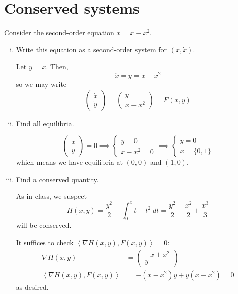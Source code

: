 \documentclass[12pt]{article}
\newcommand{\brak}[1]{\left\langle #1 \right\rangle}
\begin{document}
\pagebreak


\section{Conserved systems}

Consider the second-order equation $\ddot{x}=x-x^2$.
\begin{enumerate}[(i)]
    \item Write this equation as a second-order system for $(x,\dot{x})$.

          \color{blue}
          Let $y = \dot x$. Then,
          \[\ddot x = \dot y = x - x^2\]
          so we may write
          \[\begin{pmatrix}
                  \dot x \\
                  \dot y
              \end{pmatrix} = \begin{pmatrix}
                  y \\
                  x - x^2
              \end{pmatrix} = F(x, y)\]
          \color{black}

    \item Find all equilibria.

          \color{blue}
          \[\begin{pmatrix}
                  \dot x \\
                  \dot y
              \end{pmatrix} = 0 \implies \begin{cases}
                  y = 0 \\
                  x - x^2 = 0
              \end{cases} \implies \begin{cases}
                  y = 0 \\
                  x = \{0, 1\}
              \end{cases}\]
          which means we have equilibria at $(0, 0)$ and $(1, 0)$.
          \color{black}

    \item Find a conserved quantity.

          \color{blue}
          As in class, we suspect
          \[H(x, y)  = \frac{y^2}{2} - \int_0^x t-t^2\; dt = \frac{y^2}{2} - \frac{x^2}{2} + \frac{x^3}{3}\]
          will be conserved.

          It suffices to check $\brak{\nabla H(x, y), F(x, y)} = 0$:
          \begin{align*}
              \nabla H(x, y)                 & = \begin{pmatrix}
                                                     -x + x^2 \\
                                                     y
                                                 \end{pmatrix}                \\
              \brak{\nabla H(x, y), F(x, y)} & = -(x - x^2)y + y(x -  x^2) = 0
          \end{align*}
          as desired.
          \color{black}


\end{enumerate}
\end{document}
